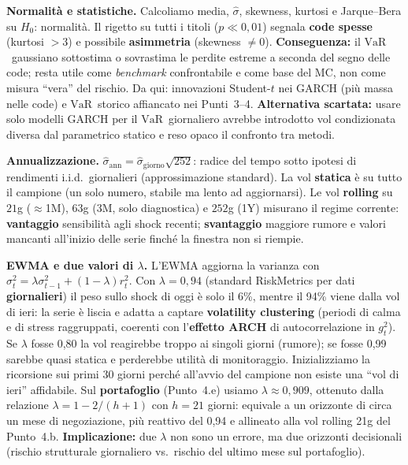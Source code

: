 \documentclass[12pt,a4paper]{article}
\newcommand{\VaR}{\ensuremath{\mathrm{VaR}}}
\begin{document}
\textbf{Normalità e statistiche.} Calcoliamo media, $\hat\sigma$, skewness, kurtosi e Jarque--Bera su $H_0$: normalità. Il rigetto su tutti i titoli ($p\ll 0{,}01$) segnala \textbf{code spesse} (kurtosi $>3$) e possibile \textbf{asimmetria} (skewness $\neq 0$). \textbf{Conseguenza:} il \VaR\ gaussiano sottostima o sovrastima le perdite estreme a seconda del segno delle code; resta utile come \emph{benchmark} confrontabile e come base del MC, non come misura ``vera'' del rischio. Da qui: innovazioni Student-$t$ nei GARCH (più massa nelle code) e \VaR\ storico affiancato nei Punti~3--4. \textbf{Alternativa scartata:} usare solo modelli GARCH per il \VaR\ giornaliero avrebbe introdotto vol condizionata diversa dal parametrico statico e reso opaco il confronto tra metodi.

\textbf{Annualizzazione.} $\hat\sigma_{\mathrm{ann}}=\hat\sigma_{\mathrm{giorno}}\sqrt{252}$: radice del tempo sotto ipotesi di rendimenti i.i.d.\ giornalieri (approssimazione standard). La vol \textbf{statica} è su tutto il campione (un solo numero, stabile ma lento ad aggiornarsi). Le vol \textbf{rolling} su $21$g ($\approx$1M), $63$g (3M, solo diagnostica) e $252$g (1Y) misurano il regime corrente: \textbf{vantaggio} sensibilità agli shock recenti; \textbf{svantaggio} maggiore rumore e valori mancanti all'inizio delle serie finché la finestra non si riempie.

\textbf{EWMA e due valori di $\lambda$.} L'EWMA aggiorna la varianza con $\sigma_t^2=\lambda\sigma_{t-1}^2+(1-\lambda)r_t^2$. Con $\lambda=0{,}94$ (standard RiskMetrics per dati \textbf{giornalieri}) il peso sullo shock di oggi è solo il 6\%, mentre il 94\% viene dalla vol di ieri: la serie è liscia e adatta a captare \textbf{volatility clustering} (periodi di calma e di stress raggruppati, coerenti con l'\textbf{effetto ARCH} di autocorrelazione in $g_t^2$). Se $\lambda$ fosse 0,80 la vol reagirebbe troppo ai singoli giorni (rumore); se fosse 0,99 sarebbe quasi statica e perderebbe utilità di monitoraggio. Inizializziamo la ricorsione sui primi $30$ giorni perché all'avvio del campione non esiste una ``vol di ieri'' affidabile. Sul \textbf{portafoglio} (Punto~4.e) usiamo $\lambda\approx 0{,}909$, ottenuto dalla relazione $\lambda=1-2/(h+1)$ con $h=21$ giorni: equivale a un orizzonte di circa un mese di negoziazione, più reattivo del 0,94 e allineato alla vol rolling 21g del Punto~4.b. \textbf{Implicazione:} due $\lambda$ non sono un errore, ma due orizzonti decisionali (rischio strutturale giornaliero vs.\ rischio del ultimo mese sul portafoglio).
\end{document}
